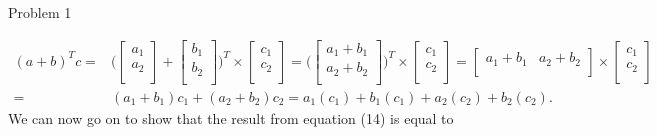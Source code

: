 \begin{problem}{Problem 1}
\begin{Highlight}
        \begin{align}
            (a + b)^{T}c = & \Bigg(
            \begin{bmatrix}
                a_{1} \\
                a_{2} \\
            \end{bmatrix}
            + 
            \begin{bmatrix}
                b_{1} \\
                b_{2} \\
            \end{bmatrix}
            \Bigg)^{T} \times
            \begin{bmatrix}
                c_{1} \\
                c_{2} \\
            \end{bmatrix}
            = \Bigg(
            \begin{bmatrix}
                a_{1} + b_{1} \\
                a_{2} + b_{2} \\
            \end{bmatrix}
            \Bigg)^{T} \times
            \begin{bmatrix}
                c_{1} \\
                c_{2} \\
            \end{bmatrix}
            = 
            \begin{bmatrix}
                a_{1} + b_{1} & a_{2} + b_{2} \\
            \end{bmatrix}
            \times 
            \begin{bmatrix}
                c_{1} \\
                c_{2} \\
            \end{bmatrix} \\
            = & (a_{1} + b_{1})c_{1} + (a_{2} + b_{2})c_{2} = a_{1}(c_{1}) + b_{1}(c_{1}) + a_{2}(c_{2}) + b_{2}(c_{2}).
        \end{align}
        We can now go on to show that the result from equation (14) is equal to


\end{Highlight}
\end{problem}
